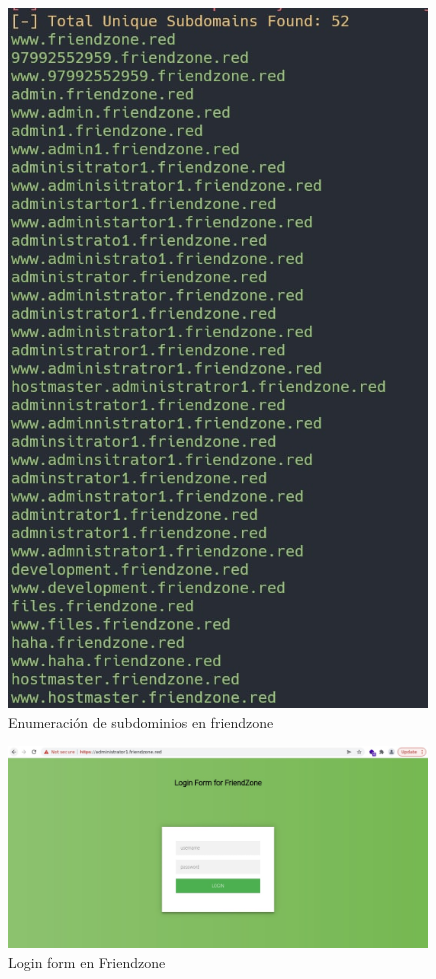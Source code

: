         \begin{figure}[H]
            \centering
            \includegraphics[width=0.99\textwidth]{informe4/imagenes/friendzone/12_sublister2.png}
            \caption{Enumeración de subdominios en friendzone} 
        \end{figure}

        \begin{figure}[H]
            \centering
            \includegraphics[width=0.99\textwidth]{informe4/imagenes/friendzone/13_administratorpage.png}
            \caption{Login form en Friendzone} 
        \end{figure}

